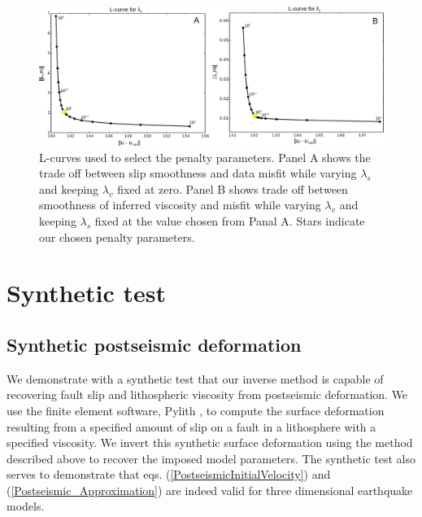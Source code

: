 \documentclass[extra]{gji}
\begin{document}
\begin{figure}\label{figure2}
  \centering
  \includegraphics[scale=0.43]{FinalFigures/Figure6.pdf}
  \caption{L-curves used to select the penalty parameters. Panel A
    shows the trade off between slip smoothness and data misfit while
    varying $\lambda_s$ and keeping $\lambda_v$ fixed at zero.  Panel
    B shows trade off between smoothness of inferred viscosity and
    misfit while varying $\lambda_v$ and keeping $\lambda_s$ fixed at
    the value chosen from Panal A.  Stars indicate our chosen penalty
    parameters.}
  \label{Figure 2}
\end{figure}

\section{Synthetic test}
\subsection{Synthetic postseismic deformation}

We demonstrate with a synthetic test that our inverse method is
capable of recovering fault slip and lithospheric viscosity from
postseismic deformation.  We use the finite element software, Pylith
\citep{A2007}, to compute the surface deformation resulting from a
specified amount of slip on a fault in a lithosphere with a specified
viscosity.  We invert this synthetic surface deformation using the
method described above to recover the imposed model parameters.  The
synthetic test also serves to demonstrate that
eqs. (\ref{PostseismicInitialVelocity}) and
(\ref{Postseismic_Approximation}) are indeed valid for three
dimensional earthquake models.
\end{document}
